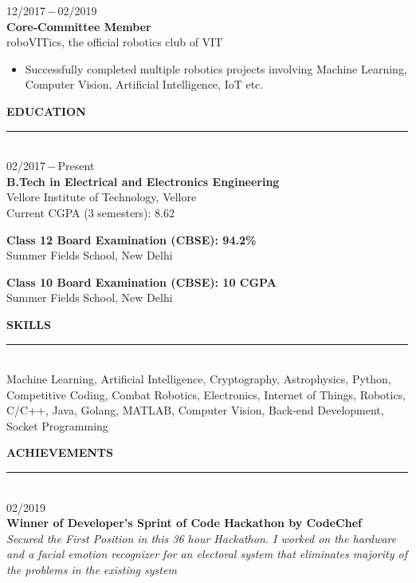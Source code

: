 \documentclass[a4paper, 12pt]{article}
\begin{document}
    \begin{flushleft}
        12/2017\,$-$\,02/2019\\
        \textbf{Core-Committee Member}\\
        roboVITics, the official robotics club of VIT
        \begin{itemize}
            \item Successfully completed multiple robotics projects involving Machine Learning, Computer Vision, Artificial Intelligence, IoT etc.
        \end{itemize}
    \end{flushleft}

    \begin{flushleft}
        \textbf{EDUCATION}\\\noindent\rule{\textwidth}{1pt}\\
        02/2017\,$-$\,Present\\
        \textbf{B.Tech in Electrical and Electronics Engineering}\\
        Vellore Institute of Technology, Vellore\\ Current CGPA (3 semesters): 8.62
    \end{flushleft}
    
    \begin{flushleft}
        \textbf{Class 12 Board Examination (CBSE): 94.2\%}\\Summer Fields School, New Delhi
    \end{flushleft}
    
    \begin{flushleft}
        \textbf{Class 10 Board Examination (CBSE): 10 CGPA}\\Summer Fields School, New Delhi
    \end{flushleft}
    
    \begin{flushleft}
        \textbf{SKILLS}\\\noindent\rule{\textwidth}{1pt}\newline\\Machine Learning, Artificial Intelligence, Cryptography, Astrophysics, Python, Competitive Coding, Combat Robotics, Electronics, Internet of Things, Robotics, C/C++, Java, Golang, MATLAB, Computer Vision, Back-end Development, Socket Programming\\
    \end{flushleft}
    
    \begin{flushleft}
        \textbf{ACHIEVEMENTS}\\\noindent\rule{\textwidth}{1pt}\newline\\02/2019\\\textbf{Winner of Developer's Sprint of Code Hackathon by CodeChef}\\\textit{Secured the First Position in this 36 hour Hackathon. I worked on the hardware and a facial emotion recognizer for an electoral system that eliminates majority of the problems in the existing system}
    \end{flushleft}
    
\end{document}
